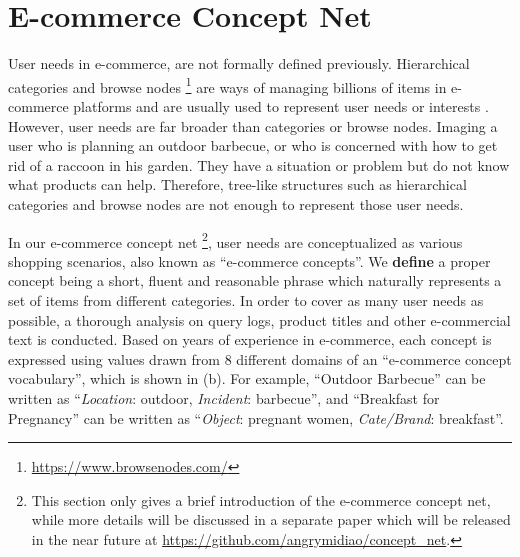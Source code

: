 \section{E-commerce Concept Net} 
\label{sec:ecn}

User needs in e-commerce, are not formally defined previously.
Hierarchical categories and browse nodes \footnote{\url{https://www.browsenodes.com/}} are ways of managing billions of items in e-commerce platforms
and are usually used to represent user needs or interests \cite{zhou2018deep, feng2019deep}.
However, user needs are far broader than categories or browse nodes. Imaging a user who is planning an outdoor barbecue, or who is concerned with how to get rid of a raccoon in his garden.
They have a situation or problem but do not know what products can help.
Therefore, tree-like structures such as hierarchical categories and browse nodes are not enough to represent those user needs.

In our e-commerce concept net \footnote{This section only gives
a brief introduction of the e-commerce concept net, while more details will be 
discussed in a separate paper which will be released in the near future at \url{https://github.com/angrymidiao/concept_net}.},
user needs are conceptualized as various shopping scenarios, also known as ``e-commerce concepts''.
We \textbf{define} a proper concept being a short, fluent and reasonable phrase which naturally represents a set of items from different categories.
In order to cover as many user needs as possible,
a thorough analysis on query logs, product titles and other e-commercial text is conducted.
Based on years of experience in e-commerce,
each concept is expressed using values drawn from $8$ different domains of
an ``e-commerce concept vocabulary'', which is shown in  (b).
For example, ``Outdoor Barbecue'' can be written as 
``\textit{Location}: outdoor, \textit{Incident}: barbecue'', 
and ``Breakfast for Pregnancy'' can be written as ``\textit{Object}: pregnant women, \textit{Cate/Brand}: breakfast''.

